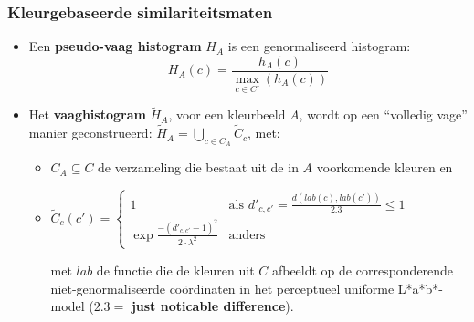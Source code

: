 \documentclass[dutch]{beamer}
\theoremstyle{definition}
\theoremstyle{remark}
\theoremstyle{example}
\begin{document}
\frame
{
  \frametitle{Kleurgebaseerde similariteitsmaten}
  
  \begin{itemize}
  \item Een \textbf{pseudo-vaag histogram} $H_A$ is een genormaliseerd histogram:
  \begin{displaymath}
  H_A(c) = \frac{\displaystyle h_A(c)}{\displaystyle \max_{c \in C'}(h_A(c))}
  \end{displaymath}
  \item Het \textbf{vaaghistogram} $\widetilde{H}_A$, voor een kleurbeeld $A$, wordt
  op een ``volledig vage'' manier geconstrueerd:
  $\widetilde{H}_A = \bigcup_{c \in C_A} \widetilde{C}_c$,
  met:
  \begin{itemize} 
  \item $C_A \subseteq C$ de verzameling die bestaat uit de in $A$ voorkomende kleuren en
  \item
  \begin{minipage}{\textwidth}
  \scriptsize
  $\widetilde{C}_c(c') =
  \begin{cases}
  1 & \text{als } d'_{c,c'} = \frac{d \left( lab(c), lab(c') \right)}{2.3} \leq 1 \\ 
  \exp \frac{- \left( d'_{c,c'} - 1 \right)^2}{2 \cdot \lambda^2} & \text{anders}
  \end{cases}$
  \vspace{4pt}
  \end{minipage}
  met $lab$ de 
  functie die de kleuren uit $C$ afbeeldt op de corresponderende niet-genormaliseerde 
  co\"ordinaten in het perceptueel uniforme L*a*b*-model 
  ($2.3 =$ \textbf{just noticable difference}).
  \end{itemize}
  \end{itemize}
}
\frame
\end{document}
